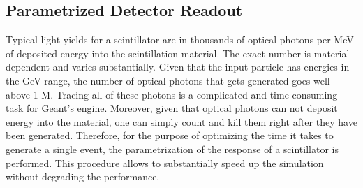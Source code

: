 \subsection{Parametrized Detector Readout}
Typical light yields for a scintillator are in thousands of optical photons per MeV of deposited energy into the scintillation material. The exact number is material-dependent and varies substantially. Given that the input particle has energies in the GeV range, the number of optical photons that gets generated goes well above 1 M. Tracing all of these photons is a complicated and time-consuming task for Geant's engine. Moreover, given that optical photons can not deposit energy into the material, one can simply count and kill them right after they have been generated. Therefore, for the purpose of optimizing the time it takes to generate a single event, the parametrization of the response of a scintillator is performed. This procedure allows to substantially speed up the simulation without degrading the performance.

